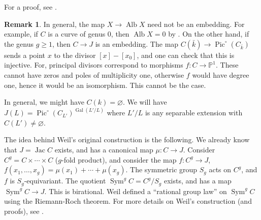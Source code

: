 \documentclass{article}
\DeclareMathOperator{\gal}{Gal}
\DeclareMathOperator{\jac}{Jac}
\DeclareMathOperator{\pic}{Pic}
\theoremstyle{definition}
\newtheorem{remark}[subsection]{Remark}
\begin{document}
For a proof, see \cite[III.1.2]{mi}. 

\begin{remark}
In general, the map $X\to \operatorname{Alb} X$ need not be an embedding. 
For example, if $C$ is a curve of genus $0$, then $\operatorname{Alb} X=0$ by 
\cite[I.3.9]{mi}. On the other hand, if the genus $g\geqslant 1$, then 
$C\to J$ is an embedding. The map $C(\bar k)\to \pic^\circ(C_{\bar k})$ sends 
a point $x$ to the divisor $[x]-[x_0]$, and one can check that this is 
injective. For, principal divisors correspond to morphisms 
$f:C\to\mathbb{P}^1$. These cannot have zeros and poles of multiplicity one, 
otherwise $f$ would have degree one, hence it would be an isomorphism. This 
cannot be the case. 
\end{remark}

In general, we might have $C(k)=\varnothing$. We will have 
$J(L)=\pic^\circ(C_{L'})^{\gal(L'/L)}$ where $L'/L$ is any separable extension 
with $C(L')\ne\varnothing$. 

The idea behind Weil's original construction is the following. We already 
know that $J=\jac C$ exists, and has a canonical map $\mu:C\to J$. Consider 
$C^g=C\times\cdots\times C$ ($g$-fold product), and consider the map 
$f:C^g\to J$, $f(x_1,\dotsc,x_g)=\mu(x_1)+\cdots+\mu(x_g)$. The symmetric 
group $S_g$ acts on $C^g$, and $f$ is $S_g$-equivariant. The quotient 
$\operatorname{Sym}^g C = C^g/S_g$ exists, and has a map 
$\operatorname{Sym}^g C\to J$. This is birational. Weil defined a ``rational 
group law'' on $\operatorname{Sym}^g C$ using the Riemann-Roch theorem. For 
more details on Weil's construction (and proofs), see \cite[III.7]{mi}. 












\end{document}
